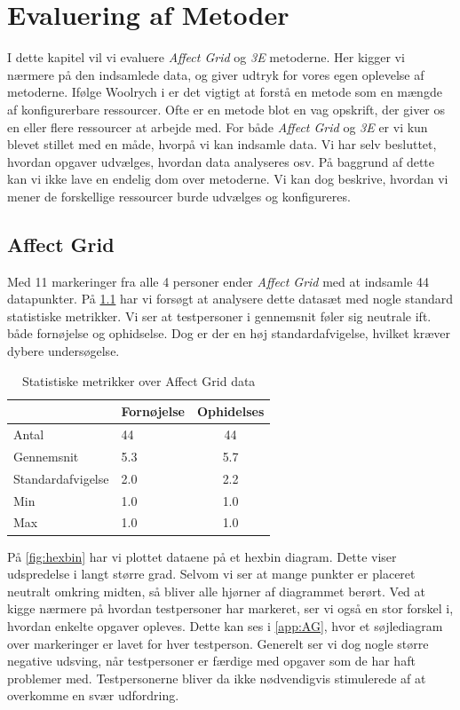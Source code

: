 \chapter{Evaluering af Metoder}\label{ch:evalmet}
I dette kapitel vil vi evaluere \textit{Affect Grid} og \textit{3E} metoderne. Her kigger vi nærmere på den indsamlede data, og giver udtryk for vores egen oplevelse af metoderne. Ifølge Woolrych i \cite{Woolrych} er det vigtigt at forstå en metode som en mængde af konfigurerbare ressourcer. Ofte er en metode blot en vag opskrift, der giver os en eller flere ressourcer at arbejde med. For både \textit{Affect Grid} og \textit{3E} er vi kun blevet stillet med en måde, hvorpå vi kan indsamle data. Vi har selv besluttet, hvordan opgaver udvælges, hvordan data analyseres osv. På baggrund af dette kan vi ikke lave en endelig dom over metoderne. Vi kan dog beskrive, hvordan vi mener de forskellige ressourcer burde udvælges og konfigureres.

\section{Affect Grid}\label{sec:evalAG}
Med 11 markeringer fra alle 4 personer ender \textit{Affect Grid} med at indsamle 44 datapunkter. På \cref{tab:AG} har vi forsøgt at analysere dette datasæt med nogle standard statistiske metrikker. Vi ser at testpersoner i gennemsnit føler sig neutrale ift. både fornøjelse og ophidselse. Dog er der en høj standardafvigelse, hvilket kræver dybere undersøgelse.  

\begin{table}[]
\centering
\label{tab:AG}
\begin{tabular}{|l|l|c|}
\hline
                  & Fornøjelse & Ophidelses               \\ \hline
Antal             & 44         & 44                       \\ \hline
Gennemsnit        & 5.3        & 5.7                      \\ \hline
Standardafvigelse & 2.0        & 2.2                      \\ \hline
Min               & 1.0        & 1.0 \\ \hline
Max               & 1.0        & 1.0 \\ \hline
\end{tabular}
\caption{Statistiske metrikker over Affect Grid data}
\end{table}

På \cref{fig:hexbin} har vi plottet dataene på et hexbin diagram. Dette viser udspredelse i langt større grad. Selvom vi ser at mange punkter er placeret neutralt omkring midten, så bliver alle hjørner af diagrammet berørt. Ved at kigge nærmere på hvordan testpersoner har markeret, ser vi også en stor forskel i, hvordan enkelte opgaver opleves. Dette kan ses i \cref{app:AG}, hvor et søjlediagram over markeringer er lavet for hver testperson. Generelt ser vi dog nogle større negative udsving, når testpersoner er færdige med opgaver som de har haft problemer med. Testpersonerne bliver da ikke nødvendigvis stimulerede af at overkomme en svær udfordring. 

